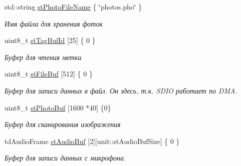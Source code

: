 \begin{DoxyCompactItemize}
\mbox{\label{namespacecommon_a373798ef1a9c0a94b49bc38455d62d10}} 
std\+::string \hyperlink{namespacecommon_a373798ef1a9c0a94b49bc38455d62d10}{st\+Photo\+File\+Name} \{ \char`\"{}photos.\+pho\char`\"{} \}
\begin{DoxyCompactList}\small\item\em Имя файла для хранения фоток \end{DoxyCompactList}\item 
\mbox{\label{namespacecommon_ad9edd5582300fe9f535b3d2f912291bb}} 
uint8\+\_\+t \hyperlink{namespacecommon_ad9edd5582300fe9f535b3d2f912291bb}{st\+Tag\+Buf\+Id} \mbox{[}25\mbox{]} \{ 0 \}
\begin{DoxyCompactList}\small\item\em Буфер для чтения метки \end{DoxyCompactList}\item 
\mbox{\label{namespacecommon_a07e080fe05fc55b6f3eab1de78a1157a}} 
uint8\+\_\+t \hyperlink{namespacecommon_a07e080fe05fc55b6f3eab1de78a1157a}{st\+File\+Buf} \mbox{[}512\mbox{]} \{ 0 \}
\begin{DoxyCompactList}\small\item\em Буфер для записи данных в файл. Он здесь, т.\+к. S\+D\+IO работает по D\+MA. \end{DoxyCompactList}\item 
\mbox{\label{namespacecommon_a5603cfb8998012c5d4e0bb217baf8293}} 
uint8\+\_\+t \hyperlink{namespacecommon_a5603cfb8998012c5d4e0bb217baf8293}{st\+Photo\+Buf} \mbox{[}1600 $\ast$40\mbox{]} \{0\}
\begin{DoxyCompactList}\small\item\em Буфер для сканирования изображения \end{DoxyCompactList}\item 
\mbox{\label{namespacecommon_aeca12b629edac6586f4b0fbcf9617769}} 
td\+Audio\+Frame \hyperlink{namespacecommon_aeca12b629edac6586f4b0fbcf9617769}{st\+Audio\+Buf} \mbox{[}2\mbox{]}\mbox{[}unit\+::st\+Audio\+Buf\+Size\mbox{]} \{ 0 \}
\begin{DoxyCompactList}\small\item\em Буфер для записи данных с микрофона. \end{DoxyCompactList}\item 

\end{DoxyCompactItemize}
